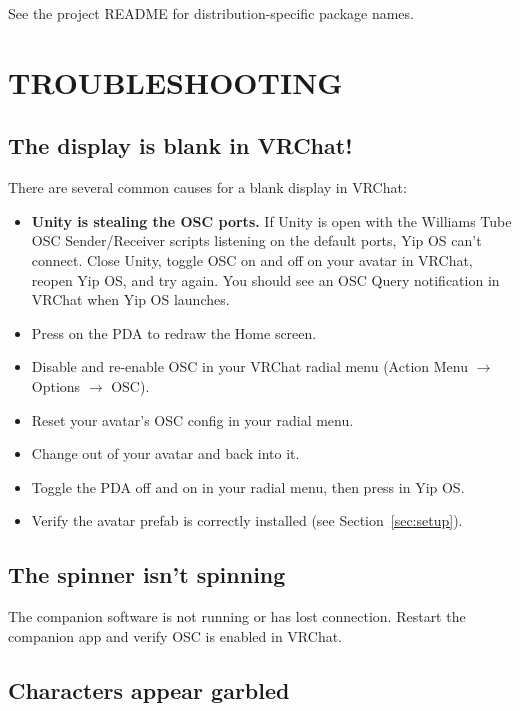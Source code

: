 \documentclass[10pt]{article}
\newcommand{\key}[1]{\fbox{\texttt{\footnotesize #1}}}
\begin{document}
\noindent See the project README for distribution-specific package names.

\section{TROUBLESHOOTING}
\label{sec:troubleshooting}

\subsection{The display is blank in VRChat!}
\label{sec:blankdisplay}

There are several common causes for a blank display in VRChat:

\begin{itemize}[leftmargin=2em, nosep]
  \item \textbf{Unity is stealing the OSC ports.} If Unity is open with the Williams Tube OSC Sender/Receiver scripts listening on the default ports, Yip OS can't connect. Close Unity, toggle OSC on and off on your avatar in VRChat, reopen Yip OS, and try again. You should see an OSC Query notification in VRChat when Yip OS launches.
  \item Press \key{BACK} on the PDA to redraw the Home screen.
  \item Disable and re-enable OSC in your VRChat radial menu (Action Menu $\rightarrow$ Options $\rightarrow$ OSC).
  \item Reset your avatar's OSC config in your radial menu.
  \item Change out of your avatar and back into it.
  \item Toggle the PDA off and on in your radial menu, then press \key{BACK} in Yip OS.
  \item Verify the avatar prefab is correctly installed (see Section~\ref{sec:setup}).
\end{itemize}

\subsection{The spinner isn't spinning}

The companion software is not running or has lost connection. Restart the companion app and verify OSC is enabled in VRChat.

\subsection{Characters appear garbled}
\end{document}
